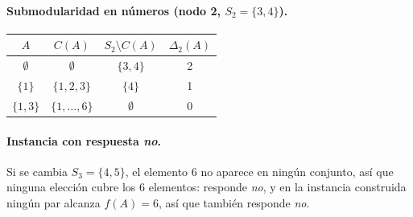 \paragraph{Submodularidad en números (nodo 2, $S_2=\{3,4\}$).}
\begin{center}
\begin{tabular}{cccc}
\toprule
\rowcolor{uccielo} $A$ & $C(A)$ & $S_2\setminus C(A)$ & $\Delta_2(A)$ \\
\midrule
$\emptyset$ & $\emptyset$ & $\{3,4\}$ & 2 \\
$\{1\}$ & $\{1,2,3\}$ & $\{4\}$ & 1 \\
$\{1,3\}$ & $\{1,\dots,6\}$ & $\emptyset$ & 0 \\
\bottomrule
\end{tabular}
\end{center}

\paragraph{Instancia con respuesta \emph{no}.} Si se cambia $S_3=\{4,5\}$, el elemento $6$ no aparece en ningún conjunto, así que ninguna elección cubre los $6$ elementos: \MC{} responde \emph{no}, y en la instancia construida ningún par alcanza $f(A)=6$, así que \SEL{} también responde \emph{no}.
